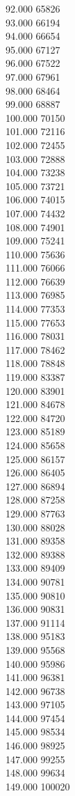 { 92.000	65826 \\
 93.000	66194 \\
 94.000	66654 \\
 95.000	67127 \\
 96.000	67522 \\
 97.000	67961 \\
 98.000	68464 \\
 99.000	68887 \\
 100.000	70150 \\
 101.000	72116 \\
 102.000	72455 \\
 103.000	72888 \\
 104.000	73238 \\
 105.000	73721 \\
 106.000	74015 \\
 107.000	74432 \\
 108.000	74901 \\
 109.000	75241 \\
 110.000	75636 \\
 111.000	76066 \\
 112.000	76639 \\
 113.000	76985 \\
 114.000	77353 \\
 115.000	77653 \\
 116.000	78031 \\
 117.000	78462 \\
 118.000	78848 \\
 119.000	83387 \\
 120.000	83901 \\
 121.000	84678 \\
 122.000	84720 \\
 123.000	85189 \\
 124.000	85658 \\
 125.000	86157 \\
 126.000	86405 \\
 127.000	86894 \\
 128.000	87258 \\
 129.000	87763 \\
 130.000	88028 \\
 131.000	89358 \\
 132.000	89388 \\
 133.000	89409 \\
 134.000	90781 \\
 135.000	90810 \\
 136.000	90831 \\
 137.000	91114 \\
 138.000	95183 \\
 139.000	95568 \\
 140.000	95986 \\
 141.000	96381 \\
 142.000	96738 \\
 143.000	97105 \\
 144.000	97454 \\
 145.000	98534 \\
 146.000	98925 \\
 147.000	99255 \\
 148.000	99634 \\
 149.000	100020 \\
}
